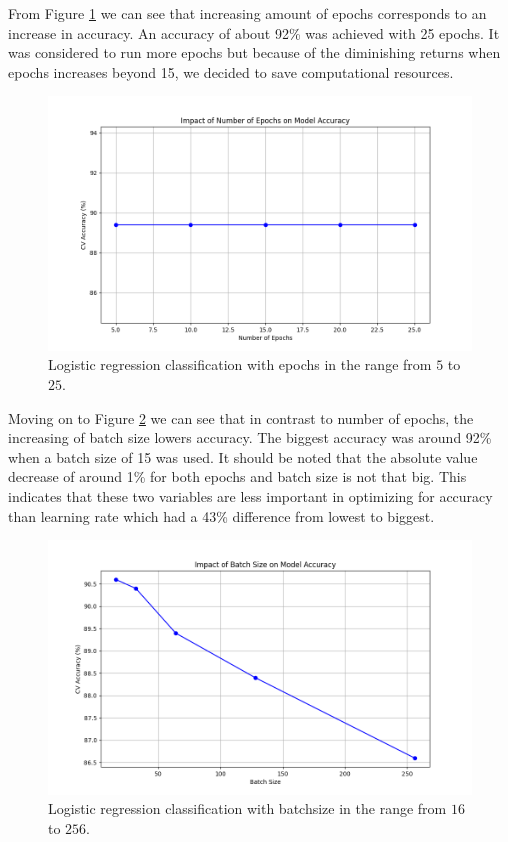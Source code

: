 From Figure \ref{fig:LogRegEpochs} we can see that increasing amount of epochs corresponds to an increase in accuracy. An accuracy of about 92\% was achieved with 25 epochs. It was considered to run more epochs but because of the diminishing returns when epochs increases beyond 15, we decided to save computational resources. 

\begin{figure}[H]
    \centering
    \includegraphics[width=\textwidth]{results/logreg/number_of_epochs_study.png}
    \caption{Logistic regression classification with epochs in the range from $5$ to $25$.}
    \label{fig:LogRegEpochs}
\end{figure}

Moving on to Figure \ref{fig:LogRegBatchsize} we can see that in contrast to number of epochs, the increasing of batch size lowers accuracy. The biggest accuracy was around 92\% when a batch size of 15 was used. It should be noted that the absolute value decrease of around 1\% for both epochs and batch size is not that big. This indicates that these two variables are less important in optimizing for accuracy than learning rate which had a 43\% difference from lowest to biggest. 

\begin{figure}[H]
    \centering
    \includegraphics[width=\textwidth]{results/logreg/batch_size_study.png}
    \caption{Logistic regression classification with batchsize in the range from $16$ to $256$.}
    \label{fig:LogRegBatchsize}
\end{figure}

